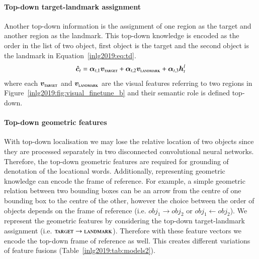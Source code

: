 \paragraph{Top-down target-landmark assignment} 
Another top-down information is the assignment of one region as the target and another region as the landmark. 
This top-down knowledge is encoded as the order in the list of two object, first object is the target and the second object is the landmark in Equation~\ref{inlg2019:eq:td}. 
\begin{equation}
\hat{\bm{c}}_t = \bm{\alpha}_{t,1} \bm{v}_{\textsc{target}} + \bm{\alpha}_{t,2} \bm{v}_{\textsc{landmark}} + \bm{\alpha}_{t,3} {\bm{h}_t^l}
\end{equation}
\noindent where each $\bm{v}_{\textsc{target}}$ and $\bm{v}_{\textsc{landmark}}$ are the visual features referring to two regions in Figure~\ref{inlg2019:fig:visual_finetune_b} and their semantic role is defined top-down.


\paragraph{Top-down geometric features}
With top-down localisation we may lose the relative location of two objects since they are processed separately in two disconnected convolutional neural networks.
Therefore, the top-down geometric features are required for grounding of denotation of the locational words.
Additionally, representing geometric knowledge can encode the frame of reference. 
For example, a simple geometric relation between two bounding boxes can be an arrow from the centre of one bounding box to the centre of the other, however the choice between the order of objects depends on the frame of reference (i.e. $obj_1 \rightarrow obj_2$ or $obj_1 \leftarrow obj_2$). 
We represent the geometric features by considering the top-down target-landmark assignment (i.e. $\textsc{target} \rightarrow \textsc{landmark}$). 
Therefore with these feature vectors we encode the top-down frame of reference as well.
This creates different variations of feature fusions (Table~\ref{inlg2019:tab:models2}).

